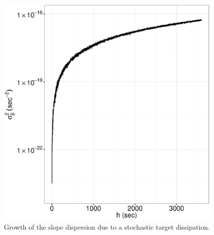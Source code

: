 \documentclass{article}
\begin{document}
\begin{figure}[h]
\centering
\includegraphics[scale=.5]{varB_DissipThick.eps}
\caption{Growth of the slope dispersion due to a stochastic target dissipation.\label{fig:varB_TD}}
\end{figure}
\end{document}
